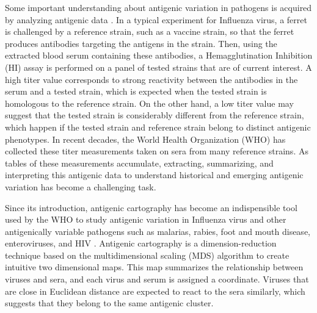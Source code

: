 \documentclass[11pt,oneside,letterpaper]{article}
\begin{document}
Some important understanding about antigenic variation in pathogens is acquired by analyzing antigenic data \cite{smith_mapping_2004, jong_antigenic_2007}. 
In a typical experiment for Influenza virus, a ferret is challenged by a reference strain, such as a vaccine strain, so that the ferret produces antibodies targeting the antigens in the strain. 
Then, using the extracted blood serum containing these antibodies, a Hemagglutination Inhibition (HI) assay is performed on a panel of tested strains that are of current interest. 
A high titer value corresponds to strong reactivity between the antibodies in the serum and a tested strain, which is expected when the tested strain is homologous to the reference strain.
On the other hand, a low titer value may suggest that the tested strain is considerably different from the reference strain, which happen if the tested strain and reference strain belong to distinct antigenic phenotypes. 
In recent decades, the World Health Organization (WHO) has collected these titer measurements taken on sera from many reference strains\cite{smith_mapping_2004}. 
As tables of these measurements accumulate, extracting, summarizing, and interpreting this antigenic data to understand historical and emerging antigenic variation has become a challenging task.

Since its introduction, antigenic cartography \cite{smith_mapping_2004, cai_computational_2010} has become an indispensible tool used by the WHO to study antigenic variation in Influenza virus and other antigenically variable pathogens such as malarias, rabies, foot and mouth disease, enteroviruses, and HIV \cite{smith_mapping_2004, jong_antigenic_2007, ludi_antigenic_2014, frost_mapping_2013}.
Antigenic cartography is a dimension-reduction technique based on the multidimensional scaling (MDS) algorithm to create intuitive two
dimensional maps. 
This map summarizes the relationship between viruses and sera, and each virus and serum is assigned a coordinate.
Viruses that are close in Euclidean distance are expected to react to the sera similarly, which suggests that they belong to the same antigenic cluster. 
\end{document}
